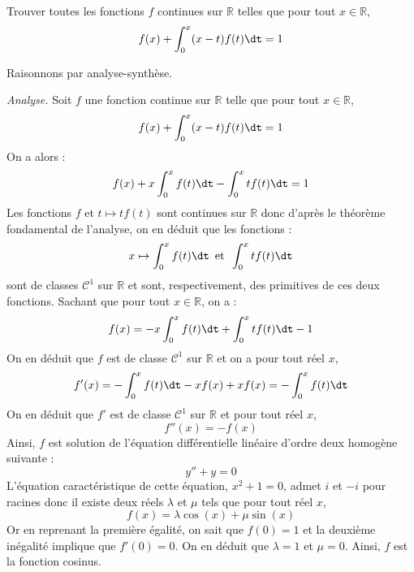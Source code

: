 \documentclass[a4paper,10pt]{report}
\begin{document}
\begin{Exercice}{} Trouver toutes les fonctions $f$ continues sur $\mathbb{R}$ telles que pour tout $x \in \mathbb{R}$,
$$ f(x) + \int_{0}^x (x-t)f(t) \dt =1$$
\end{Exercice} 

\corr Raisonnons par analyse-synthèse.

\medskip

\noindent \textit{Analyse.} Soit $f$ une fonction continue sur $\mathbb{R}$ telle que pour tout $x \in \mathbb{R}$,
$$ f(x) + \int_{0}^x (x-t)f(t) \dt =1$$
On a alors :
$$ f(x) + x \int_0^x f(t) \dt - \int_0^x t f(t) \dt = 1$$
Les fonctions $f$ et $t \mapsto t f(t)$ sont continues sur $\mathbb{R}$ donc d'après le théorème fondamental de l'analyse, on en déduit que les fonctions :
$$x \mapsto \int_0^x f(t) \dt \, \hbox{ et } \, \int_0^x tf(t) \dt$$ 
sont de classes $\mathcal{C}^1$ sur $\mathbb{R}$ et sont, respectivement, des primitives de ces deux fonctions. Sachant que pour tout $x \in \mathbb{R}$, on a :
$$ f(x) =  -x \int_0^x f(t) \dt + \int_0^x t f(t) \dt - 1$$
On en déduit que $f$ est de classe $\mathcal{C}^1$ sur $\mathbb{R}$ et on a pour tout réel $x$,
$$ f'(x) = - \int_0^x f(t) \dt - xf(x) + xf(x) = - \int_0^x f(t) \dt$$
On en déduit que $f'$ est de classe $\mathcal{C}^1$ sur $\mathbb{R}$ et pour tout réel $x$,
$$ f''(x) = -f(x)$$
Ainsi, $f$ est solution de l'équation différentielle linéaire d'ordre deux homogène suivante :
$$ y''+y=0$$
L'équation caractéristique de cette équation, $x^2+1=0$, admet $i$ et $-i$ pour racines donc il existe deux réels $\lambda$ et $\mu$ tels que pour tout réel $x$,
$$ f(x) = \lambda \cos(x) + \mu \sin(x)$$
Or en reprenant la première égalité, on sait que $f(0)=1$ et la deuxième inégalité implique que $f'(0)=0$. On en déduit que $\lambda=1$ et $\mu=0$. Ainsi, $f$ est la fonction cosinus.

\medskip
\end{document}
